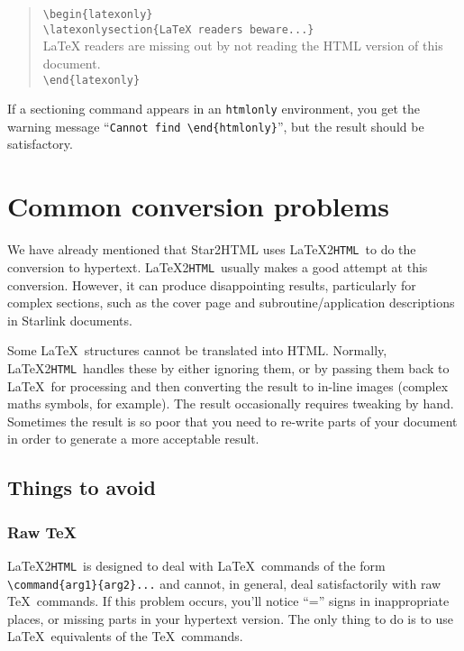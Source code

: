 \documentclass[twoside,11pt]{article}
\newcommand{\xlabel}[1]{}
\newcommand{\latextohtml}{\LaTeX2\texttt{HTML}}
\renewcommand{\_}{\texttt{\symbol{95}}}
\begin{document}
\begin{quote}
\verb!\begin!\verb!{latexonly}!\\
\verb!\latexonlysection{LaTeX readers beware...}!\\
LaTeX readers are missing out by not reading the HTML version of
this document.\\
\verb!\end!\verb!{latexonly}!
\end{quote}

If a sectioning command appears in an \texttt{htmlonly} environment, you get
the warning message ``\verb#Cannot find \end#\verb#{htmlonly}#'', but
the result should be satisfactory.

\section{\xlabel{common_conversion_problems}\label{common_problems}Common conversion problems}

We have already mentioned that Star2HTML uses \latextohtml\ to do the
conversion to hypertext.
\latextohtml\ usually makes a good attempt at this conversion.
However, it can produce disappointing results, particularly for complex
sections, such as the cover page and subroutine/application descriptions in
Starlink documents.

Some \LaTeX\ structures cannot be translated into HTML.
Normally, \latextohtml\ handles these by either ignoring them, or by passing
them back to \LaTeX\ for processing and then converting the result to
in-line images (complex maths symbols, for example).
The result occasionally requires tweaking by hand.
Sometimes the result is so poor that you need to re-write parts of your
document in order to generate a more acceptable result.

\subsection{\xlabel{things_to_avoid}Things to avoid}

\subsubsection{Raw \TeX}

\latextohtml\ is designed to deal with \LaTeX\ commands of the form
\verb#\command{arg1}{arg2}...# and cannot, in general, deal satisfactorily
with raw \TeX\ commands.
If this problem occurs, you'll notice ``='' signs in inappropriate places, or
missing parts in your hypertext version.
The only thing to do is to use \LaTeX\ equivalents of the \TeX\ commands.
\end{document}
